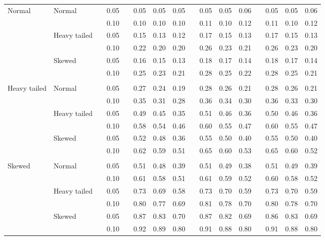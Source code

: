 \begin{table}[ht]
\begin{scriptsize}
\begin{tabular}{ll p{.1cm} c p{.1cm} rrr p{.1cm} rrr p{.1cm} rrr}
\rowcolor{gray!20} Normal       & Normal       && 0.05 &&   0.05 & 0.05 & 0.05 && 0.05 & 0.05 & 0.06 && 0.05 & 0.05 & 0.06 \\ 
\rowcolor{gray!20}             &              && 0.10 &&   0.10 & 0.10 & 0.10 && 0.11 & 0.10 & 0.12 && 0.11 & 0.10 & 0.12 \\ 
\rowcolor{gray!20}             & Heavy tailed && 0.05 &&   0.15 & 0.13 & 0.12 && 0.17 & 0.15 & 0.13 && 0.17 & 0.15 & 0.13 \\ 
\rowcolor{gray!20}             &              && 0.10 &&   0.22 & 0.20 & 0.20 && 0.26 & 0.23 & 0.21 && 0.26 & 0.23 & 0.20 \\ 
\rowcolor{gray!20}             & Skewed       && 0.05 &&   0.16 & 0.15 & 0.13 && 0.18 & 0.17 & 0.14 && 0.18 & 0.17 & 0.14 \\ 
\rowcolor{gray!20}             &              && 0.10 &&   0.25 & 0.23 & 0.21 && 0.28 & 0.25 & 0.22 && 0.28 & 0.25 & 0.21 \\ 
             &&&&&&&&&&&&&&&\\
Heavy tailed & Normal       && 0.05 &&   0.27 & 0.24 & 0.19 && 0.28 & 0.26 & 0.21 && 0.28 & 0.26 & 0.21 \\ 
             &              && 0.10 &&   0.35 & 0.31 & 0.28 && 0.36 & 0.34 & 0.30 && 0.36 & 0.33 & 0.30 \\ 
             & Heavy tailed && 0.05 &&   0.49 & 0.45 & 0.35 && 0.51 & 0.46 & 0.36 && 0.50 & 0.46 & 0.36 \\ 
             &              && 0.10 &&   0.58 & 0.54 & 0.46 && 0.60 & 0.55 & 0.47 && 0.60 & 0.55 & 0.47 \\ 
             & Skewed       && 0.05 &&   0.52 & 0.48 & 0.36 && 0.55 & 0.50 & 0.40 && 0.55 & 0.50 & 0.40 \\ 
             &              && 0.10 &&   0.62 & 0.59 & 0.51 && 0.65 & 0.60 & 0.53 && 0.65 & 0.60 & 0.52 \\
             &&&&&&&&&&&&&&&\\ 
Skewed       & Normal       && 0.05 &&   0.51 & 0.48 & 0.39 && 0.51 & 0.49 & 0.38 && 0.51 & 0.49 & 0.39 \\ 
             &              && 0.10 &&   0.61 & 0.58 & 0.51 && 0.61 & 0.59 & 0.52 && 0.60 & 0.58 & 0.52 \\ 
             & Heavy tailed && 0.05 &&   0.73 & 0.69 & 0.58 && 0.73 & 0.70 & 0.59 && 0.73 & 0.70 & 0.59 \\ 
             &              && 0.10 &&   0.80 & 0.77 & 0.69 && 0.81 & 0.78 & 0.70 && 0.80 & 0.78 & 0.70 \\ 
             & Skewed       && 0.05 &&   0.87 & 0.83 & 0.70 && 0.87 & 0.82 & 0.69 && 0.86 & 0.83 & 0.69 \\ 
             &              && 0.10 &&   0.92 & 0.89 & 0.80 && 0.91 & 0.88 & 0.80 && 0.91 & 0.88 & 0.80 \\ 


\end{tabular}
\end{scriptsize}
\end{table}
